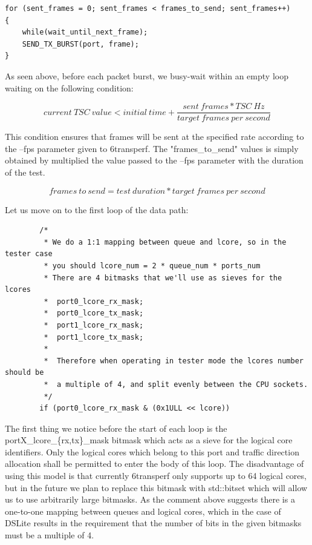 \documentclass[a4paper,12p,titlepage]{article}
\begin{document}
\begin{frame}

\lstset{language=C++,breaklines=true,numbers=left}
\begin{lstlisting}
for (sent_frames = 0; sent_frames < frames_to_send; sent_frames++)
{
	while(wait_until_next_frame);
	SEND_TX_BURST(port, frame);
}
\end{lstlisting}
\end{frame}

As seen above, before each packet burst, we busy-wait within an empty loop waiting on the following condition:

\begin{equation}
current\ TSC\ value < initial\ time + \frac{sent\ frames * TSC\ Hz}{target\ frames\ per\ second}
\end{equation}

This condition ensures that frames will be sent at the specified rate according to the --fps parameter given to 6transperf. The "frames\_to\_send" values is simply obtained by multiplied the value passed to the –fps parameter with the duration of the test.

\begin{equation}
frames\ to\ send = test\ duration * target\ frames\ per\ second
\end{equation}

Let us move on to the first loop of the data path:
\begin{frame}

\lstset{language=C++,breaklines=true,numbers=left}
\begin{lstlisting}
        /*
         * We do a 1:1 mapping between queue and lcore, so in the tester case
         * you should lcore_num = 2 * queue_num * ports_num
         * There are 4 bitmasks that we'll use as sieves for the lcores
         *  port0_lcore_rx_mask;
         *  port0_lcore_tx_mask;
         *  port1_lcore_rx_mask;
         *  port1_lcore_tx_mask;
         *
         *  Therefore when operating in tester mode the lcores number should be
         *  a multiple of 4, and split evenly between the CPU sockets.
         */
        if (port0_lcore_rx_mask & (0x1ULL << lcore))
\end{lstlisting}
\end{frame}

The first thing we notice before the start of each loop is the portX\_lcore\_\{rx,tx\}\_mask bitmask which acts as a sieve for the logical core identifiers. Only the logical cores which belong to this port and traffic direction allocation shall be permitted to enter the body of this loop. The disadvantage of using this model is that currently 6transperf only supports up to 64 logical cores, but in the future we plan to replace this bitmask with std::bitset which will allow us to use arbitrarily large bitmasks. As the comment above suggests there is a one-to-one mapping between queues and logical cores, which in the case of DSLite results in the requirement that the number of bits in the given bitmasks must be a multiple of 4.
\end{document}
